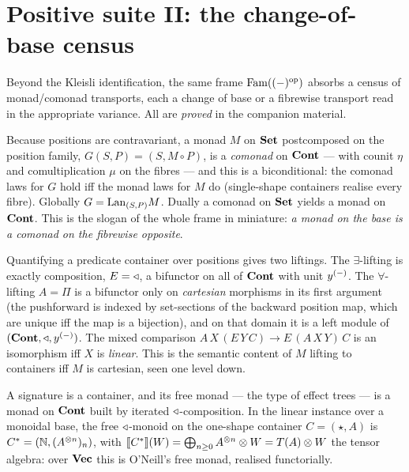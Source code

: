 \section{Positive suite II: the change-of-base census}
\label{sec:cob-changebase}

Beyond the Kleisli identification, the same frame $\mathrm{Fam}((-)^{\mathrm{op}})$ absorbs a
census of monad/comonad transports, each a change of base or a fibrewise transport
read in the appropriate variance. All are \emph{proved} in the companion material.

\begin{proposition}\label{prop:cob-transfer}
Because positions are contravariant, a monad $M$ on $\mathbf{Set}$ postcomposed on the
position family, $G(S,P)=(S,M\circ P)$, is a \emph{comonad} on $\mathbf{Cont}$ --- with
counit $\eta$ and comultiplication $\mu$ on the fibres --- and this is a
biconditional: the comonad laws for $G$ hold iff the monad laws for $M$ do
(single-shape containers realise every fibre). Globally $G=\mathrm{Lan}_{(S,P)}M$. Dually
a comonad on $\mathbf{Set}$ yields a monad on $\mathbf{Cont}$. This is the slogan of the whole
frame in miniature: \emph{a monad on the base is a comonad on the fibrewise
opposite}.
\end{proposition}

\begin{proposition}\label{prop:cob-liftings}
Quantifying a predicate container over positions gives two liftings. The
$\exists$-lifting is exactly composition, $E=\triangleleft$, a bifunctor on all of $\mathbf{Cont}$
with unit $y^{(-)}$. The $\forall$-lifting $A=\Pi$ is a bifunctor only on
\emph{cartesian} morphisms in its first argument (the pushforward is indexed by
set-sections of the backward position map, which are unique iff the map is a
bijection), and on that domain it is a left module of $(\mathbf{Cont},\triangleleft,y^{(-)})$. The
mixed comparison $A\,X\,(E\,Y\,C)\to E\,(A\,X\,Y)\,C$ is an isomorphism iff $X$ is
\emph{linear}. This is the semantic content of $M$ lifting to containers iff $M$
is cartesian, seen one level down.
\end{proposition}

\begin{proposition}\label{prop:cob-free}
A signature is a container, and its free monad --- the type of effect trees --- is
a monad on $\mathbf{Cont}$ built by iterated $\triangleleft$-composition. In the linear instance
over a monoidal base, the free $\triangleleft$-monoid on the one-shape container
$C=(\star,A)$ is $C^{*}=(\mathbb{N},(A^{\otimes n})_n)$, with
$\llbracket C^{*} \rrbracket(W)=\bigoplus_{n\ge0}A^{\otimes n}\otimes W=T(A)\otimes W$ the tensor
algebra: over $\mathbf{Vec}$ this is O'Neill's free monad, realised functorially.
\end{proposition}

